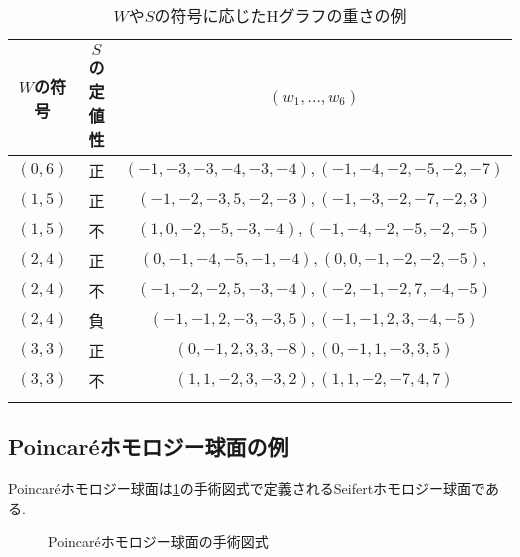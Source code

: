 \documentclass[11pt,b5paper,oneside,lualatex]{ltjsarticle} %
\numberwithin{equation}{section} %
\begin{document}
\begin{table}[htb]
	\caption{$ W $や$ S $の符号に応じたHグラフの重さの例}
	\label{tab:H-graph_ex}
	\centering
	\begin{tabular}{ccc}
		\hline\noalign{\smallskip}
		$ W $の符号 & $ S $の定値性 & $ (w_1, \dots, w_6) $ \\
		\hline
		\rowcolor[gray]{0.95}
		$ (0, 6) $ & 正 & $ (-1, -3, -3, -4, -3, -4), (-1, -4, -2, -5, -2, -7) $ \\
		$ (1, 5) $ & 正 & $ (-1, -2, -3, 5, -2, -3), (-1, -3, -2, -7, -2, 3) $ \\
		\rowcolor[gray]{0.95}
		$ (1, 5) $ & 不 & $ (1, 0, -2, -5, -3, -4), (-1, -4, -2, -5, -2, -5) $ \\
		$ (2, 4) $ & 正 & $ (0, -1, -4, -5, -1, -4), (0, 0, -1, -2, -2, -5), $ \\
		\rowcolor[gray]{0.95}
		$ (2, 4) $ & 不 & $ (-1, -2, -2, 5, -3, -4), (-2, -1, -2, 7, -4, -5) $ \\
		$ (2, 4) $ & 負 & $ (-1, -1, 2, -3, -3, 5), (-1, -1, 2, 3, -4, -5) $ \\
		\rowcolor[gray]{0.95}
		$ (3, 3) $ & 正 & $ (0, -1, 2, 3, 3, -8), (0,-1, 1, -3, 3, 5) $ \\
		$ (3, 3) $ & 不 & $ (1, 1, -2, 3, -3, 2), (1, 1, -2, -7, 4, 7) $ \\
		\hline\noalign{\smallskip}
	\end{tabular}		
\end{table}


\subsection{Poincar\'{e}ホモロジー球面の例} \label{subsec:Poincare}


Poincar\'{e}ホモロジー球面は\cref{fig:Poincare}の手術図式で定義されるSeifertホモロジー球面である. 

\begin{figure}[htb]
	\centering
	\caption{Poincar\'{e}ホモロジー球面の手術図式} \label{fig:Poincare}
\end{figure}
\end{document}
